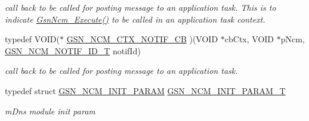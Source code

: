 \begin{DoxyCompactItemize}
\begin{DoxyCompactList}\small\item\em call back to be called for posting message to an application task. This is to indicate \hyperlink{a00688_ga3ed4d28d4f2a8195d6c37f5032ee0bbd}{GsnNcm\_\-Execute()} to be called in an application task context. \end{DoxyCompactList}\item 
typedef VOID($\ast$ \hyperlink{a00668_ga9fb71d435556873549a9da8758741a14}{GSN\_\-NCM\_\-CTX\_\-NOTIF\_\-CB} )(VOID $\ast$cbCtx, VOID $\ast$pNcm, \hyperlink{a00688_ga0be96257e7b0db4dd67006357eb5cec6}{GSN\_\-NCM\_\-NOTIF\_\-ID\_\-T} notifId)
\begin{DoxyCompactList}\small\item\em call back to be called for posting message to an application task. \end{DoxyCompactList}\item 
typedef struct \hyperlink{a00159}{GSN\_\-NCM\_\-INIT\_\-PARAM} \hyperlink{a00668_ga82bd88bbe87405a2e10adc0ee4645d7f}{GSN\_\-NCM\_\-INIT\_\-PARAM\_\-T}
\begin{DoxyCompactList}\small\item\em mDns module init param \end{DoxyCompactList}\end{DoxyCompactItemize}
